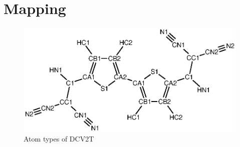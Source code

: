 \chapter{Mapping}

\begin{figure}[ht]
\includegraphics[width=0.5\linewidth]{./fig/chemical_structure/dcv2t_atom_types}
\caption{Atom types of DCV2T}
\label{fig:dcv2t_at}
\end{figure}

